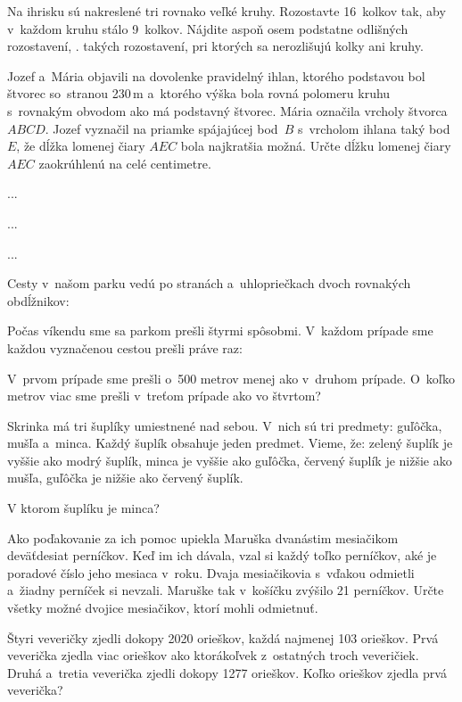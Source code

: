 {%
Na ihrisku sú nakreslené tri rovnako veľké kruhy.
Rozostavte 16~kolkov tak, aby v~každom kruhu stálo 9~kolkov.
Nájdite aspoň osem podstatne odlišných rozostavení, \tj. takých rozostavení, pri ktorých sa nerozlišujú kolky ani kruhy.
}

{%
Jozef a~Mária objavili na dovolenke pravidelný ihlan, ktorého podstavou bol štvorec so~stranou 230\,m
a~ktorého výška bola rovná polomeru kruhu s~rovnakým obvodom ako má podstavný štvorec.
Mária označila vrcholy štvorca $ABCD$.
Jozef vyznačil na priamke spájajúcej bod~$B$ s~vrcholom ihlana taký bod~$E$, že dĺžka lomenej čiary $AEC$ bola najkratšia možná.
Určte dĺžku lomenej čiary $AEC$ zaokrúhlenú na celé centimetre.
}

{%
...}

{%
...}

{%
...}

{%
Cesty v~našom parku vedú po stranách a~uhlopriečkach dvoch rovnakých obdĺžnikov:
%

Počas víkendu sme sa parkom prešli štyrmi spôsobmi.
V~každom prípade sme každou vyznačenou cestou prešli práve raz:
%

V~prvom prípade sme prešli o~500 metrov menej ako v~druhom prípade.
O~koľko metrov viac sme prešli v~treťom prípade ako vo štvrtom?
}

{%
Skrinka má tri šuplíky umiestnené nad sebou. V~nich sú tri predmety: guľôčka, mušľa a~minca. Každý šuplík obsahuje jeden predmet.
Vieme, že:
\itemitem{$\bullet$} zelený šuplík je vyššie ako modrý šuplík,
\itemitem{$\bullet$} minca je vyššie ako guľôčka,
\itemitem{$\bullet$} červený šuplík je nižšie ako mušľa,
\itemitem{$\bullet$} guľôčka je nižšie ako červený šuplík.

V ktorom šuplíku je minca?
}

{%
Ako poďakovanie za ich pomoc upiekla Maruška dvanástim mesiačikom deväťdesiat perníčkov.
Keď im ich dávala, vzal si každý toľko perníčkov, aké je poradové číslo jeho mesiaca v~roku.
Dvaja mesiačikovia s~vďakou odmietli a~žiadny perníček si nevzali. Maruške tak v~košíčku zvýšilo 21 perníčkov.
Určte všetky možné dvojice mesiačikov, ktorí mohli odmietnuť.
}

{%
Štyri veveričky zjedli dokopy 2020 orieškov, každá najmenej 103 orieškov.
Prvá veverička zjedla viac orieškov ako ktorákoľvek z~ostatných troch veveričiek.
Druhá a~tretia veverička zjedli dokopy 1277 orieškov.
Koľko orieškov zjedla prvá veverička?
}

